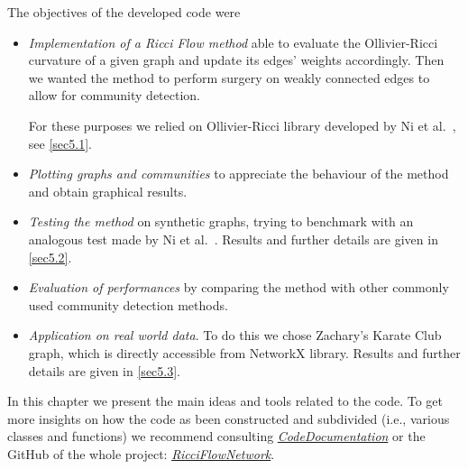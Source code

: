 The objectives of the developed code were
\begin{itemize}
    \item \emph{Implementation of a Ricci Flow method} able to evaluate the Ollivier-Ricci curvature of a given graph and update its edges' weights accordingly. Then we wanted the method to perform surgery on weakly connected edges to allow for community detection.
    
    For these purposes we relied on Ollivier-Ricci library developed by Ni et al.~\cite{Ollivier-RicciLib}, see \autoref{sec5.1}.
    
    \item \emph{Plotting graphs and communities} to appreciate the behaviour of the method and obtain graphical results.
    
    \item \emph{Testing the method} on synthetic graphs, trying to benchmark with an analogous test made by Ni et al.~\cite{Ni:communitydetectionnetworksricci}. Results and further details are given in \autoref{sec5.2}.
    
    \item \emph{Evaluation of performances} by comparing the method with other commonly used community detection methods.  
    
    \item \emph{Application on real world data}. To do this we chose Zachary's Karate Club graph, which is directly accessible from NetworkX library. Results and further details are given in \autoref{sec5.3}.
    
\end{itemize}

In this chapter we present the main ideas and tools related to the code. To get more insights on how the code as been constructed and subdivided (i.e., various classes and functions) we recommend consulting \textit{\href{https://ricciflowdocumentation.netlify.app/}{CodeDocumentation}} or the GitHub of the whole project: \textit{\href{https://github.com/fabbri-lorenzo/RicciFlowNetwork}{RicciFlowNetwork}}.